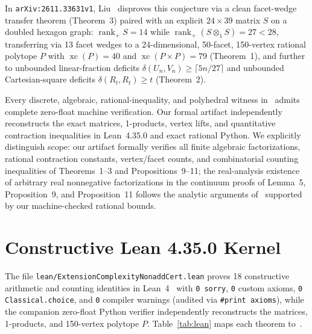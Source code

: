 \documentclass[10pt,twocolumn]{article}
\begin{document}
In \texttt{arXiv:2611.33631v1}, Liu~\cite{Liu2026} disproves this conjecture via a clean facet-wedge transfer theorem (Theorem~3) paired with an explicit $24\times 39$ matrix $S$ on a doubled hexagon graph: $\operatorname{rank}_+ S = 14$ while $\operatorname{rank}_+(S \otimes_1 S) = 27 < 28$, transferring via 13 facet wedges to a 24-dimensional, 50-facet, 150-vertex rational polytope $P$ with $\operatorname{xc}(P) = 40$ and $\operatorname{xc}(P \times P) = 79$ (Theorem~1), and further to unbounded linear-fraction deficits $\delta(U_n, V_n) \geq \lceil 5n/27\rceil$ and unbounded Cartesian-square deficits $\delta(R_t, R_t) \geq t$ (Theorem~2).

Every discrete, algebraic, rational-inequality, and polyhedral witness in~\cite{Liu2026} admits complete zero-float machine verification. Our formal artifact independently reconstructs the exact matrices, 1-products, vertex lifts, and quantitative contraction inequalities in Lean~4.35.0 and exact rational Python. We explicitly distinguish scope: our artifact formally verifies all finite algebraic factorizations, rational contraction constants, vertex/facet counts, and combinatorial counting inequalities of Theorems~1--3 and Propositions~9--11; the real-analysis existence of arbitrary real nonnegative factorizations in the continuum proofs of Lemma~5, Proposition~9, and Proposition~11 follows the analytic arguments of~\cite{Liu2026} supported by our machine-checked rational bounds.

\section{Constructive Lean 4.35.0 Kernel}
The file \texttt{lean/ExtensionComplexityNonaddCert.lean} proves 18 constructive arithmetic and counting identities in Lean~4~\cite{Lean4} with \texttt{0 sorry}, \texttt{0} custom axioms, \texttt{0 Classical.choice}, and \texttt{0} compiler warnings (audited via \texttt{\#print axioms}), while the companion zero-float Python verifier independently reconstructs the matrices, 1-products, and 150-vertex polytope $P$. Table~\ref{tab:lean} maps each theorem to~\cite{Liu2026}.
\end{document}
